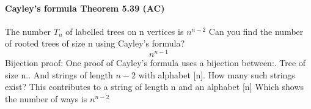 \documentclass{article}
\begin{document}
\paragraph{Cayley's formula Theorem 5.39 (AC)}
The number $T_n$ of labelled trees on n vertices is $n^{n-2}$\newline
Can you find the number of rooted trees of size n using Cayley’s formula?\newline
$$n^{n-1}$$
Bijection proof:\newline
One proof of Cayley’s formula uses a bijection between:. Tree of size n.. And strings of length $n-2$ with alphabet [n].\newline
How many such strings exist?\newline
This contributes to a string of length n and an alphabet [n]\newline
Which shows the number of ways is $n^{n-2}$
\end{document}
